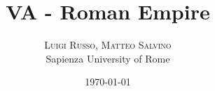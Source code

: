 \setlength{\droptitle}{-4\baselineskip} %
\pretitle{\begin{center}\Huge\bfseries} %
\posttitle{\end{center}} %
\title{VA - Roman Empire} %
\author{
  \textsc{Luigi Russo, Matteo Salvino}\\[1ex] %
  \normalsize Sapienza University of Rome \\ %
}
\date{\today} %
\renewcommand{\maketitlehookd}{
  \begin{abstract}
    \todo[inline]{Replace blindtext with abstract text}
    \noindent \blindtext
  \end{abstract}
}